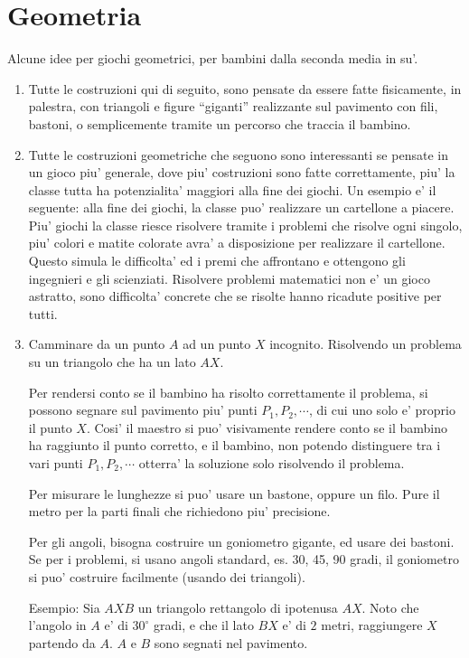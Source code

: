 \documentclass[a4paper]{article}
\begin{document}
\section{Geometria}

Alcune idee per giochi geometrici, per bambini dalla seconda media in su'.

\begin{enumerate}
    \item Tutte le costruzioni qui di seguito, sono pensate da essere fatte fisicamente, in palestra, con triangoli e figure ``giganti'' realizzante sul pavimento con fili, bastoni, o semplicemente tramite un percorso che traccia il bambino.

    \item Tutte le costruzioni geometriche che seguono sono interessanti se pensate in un gioco piu' generale, dove piu' costruzioni sono fatte correttamente, piu' la classe tutta ha potenzialita' maggiori alla fine dei giochi. Un esempio e' il seguente: alla fine dei giochi, la classe puo' realizzare un cartellone a piacere. Piu' giochi la classe riesce risolvere tramite i problemi che risolve ogni singolo, piu' colori e matite colorate avra' a disposizione per realizzare il cartellone. Questo simula le difficolta' ed i premi che affrontano e ottengono gli ingegnieri e gli scienziati. Risolvere problemi matematici non e' un gioco astratto, sono difficolta' concrete che se risolte hanno ricadute positive per tutti.
    \item Camminare da un punto $A$ ad un punto $X$ incognito. Risolvendo un problema su un triangolo che ha un lato $AX$. 

        Per rendersi conto se il bambino ha risolto correttamente il problema, si possono segnare sul pavimento piu' punti $P_1,P_2,\cdots$, di cui uno solo e' proprio il punto $X$. Cosi' il maestro si puo' visivamente rendere conto se il bambino ha raggiunto il punto corretto, e il bambino, non potendo distinguere tra i vari punti $P_1,P_2,\cdots$ otterra' la soluzione solo risolvendo il problema.

        Per misurare le lunghezze si puo' usare un bastone, oppure un filo. Pure il metro per la parti finali che richiedono piu' precisione.

        Per gli angoli, bisogna costruire un goniometro gigante, ed usare dei bastoni. Se per i problemi, si usano angoli standard, es. 30, 45, 90 gradi, il goniometro si puo' costruire facilmente (usando dei triangoli).

        Esempio: Sia $AXB$ un triangolo rettangolo di ipotenusa $AX$. Noto che l'angolo in $A$ e' di $30^{\circ}$ gradi, e che il lato $BX$ e' di $2$ metri, raggiungere $X$ partendo da $A$. $A$ e $B$ sono segnati nel pavimento.
    

\end{enumerate}
\end{document}
